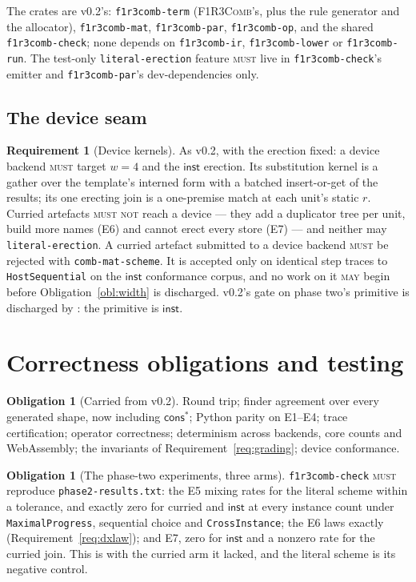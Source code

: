 \documentclass[11pt,a4paper]{article}
\newcommand{\code}[1]{\texttt{#1}}
\newcommand{\Comb}{\textsc{F1R3Comb}}
\newcommand{\MUST}{\textsc{must}}
\newcommand{\MUSTNOT}{\textsc{must not}}
\newcommand{\MAY}{\textsc{may}}
\theoremstyle{definition}
\newtheorem{requirement}[definition]{Requirement}
\newtheorem{obligation}[definition]{Obligation}
\theoremstyle{plain}
\newcommand{\inst}{\mathsf{inst}}
\newcommand{\cstar}{\mathsf{cons}^{*}}
\begin{document}
The crates are v0.2's: \code{f1r3comb-term} (\Comb's, plus the rule generator
and the allocator), \code{f1r3comb-mat}, \code{f1r3comb-par},
\code{f1r3comb-op}, and the shared \code{f1r3comb-check}; none depends on
\code{f1r3comb-ir}, \code{f1r3comb-lower} or \code{f1r3comb-run}. The
test-only \code{literal-erection} feature \MUST{} live in
\code{f1r3comb-check}'s emitter and \code{f1r3comb-par}'s dev-dependencies
only.

\subsection{The device seam}\label{sec:device}

\begin{requirement}[Device kernels]\label{req:device}
As v0.2, with the erection fixed: a device backend \MUST{} target $w = 4$ and
the $\inst$ erection. Its substitution kernel is a gather over the template's
interned form with a batched insert-or-get of the results; its one erecting
join is a one-premise match at each unit's static $r$. Curried artefacts
\MUSTNOT{} reach a device --- they add a duplicator tree per unit, build more
names (E6) and cannot erect every store (E7) --- and neither may
\code{literal-erection}. A curried artefact submitted to a device backend
\MUST{} be rejected with \code{comb-mat-scheme}. It is accepted only on
identical step traces to \code{HostSequential} on the $\inst$ conformance
corpus, and no work on it \MAY{} begin before Obligation~\ref{obl:width} is
discharged. v0.2's gate on phase two's primitive is discharged by
\cite[\S6.7]{draft3}: the primitive is $\inst$.
\end{requirement}

\section{Correctness obligations and testing}\label{sec:test}

\begin{obligation}[Carried from v0.2]\label{obl:carried}
Round trip; finder agreement over every generated shape, now including
$\cstar$; Python parity on E1--E4; trace certification; operator correctness;
determinism across backends, core counts and WebAssembly; the invariants of
Requirement~\ref{req:grading}; device conformance.
\end{obligation}

\begin{obligation}[The phase-two experiments, three arms]\label{obl:phase2}
\code{f1r3comb-check} \MUST{} reproduce \code{phase2-results.txt}: the E5
mixing rates for the literal scheme within a tolerance, and exactly zero for
curried and $\inst$ at every instance count under \code{MaximalProgress},
sequential choice and \code{CrossInstance}; the E6 laws exactly
(Requirement~\ref{req:dxlaw}); and E7, zero for $\inst$ and a nonzero rate
for the curried join. This is \cite[Obl.~11.3]{combspec} with the curried arm
it lacked, and the literal scheme is its negative control.
\end{obligation}
\end{document}
